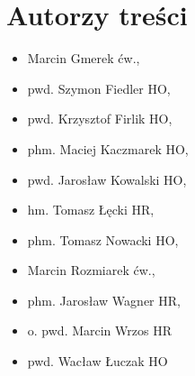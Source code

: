 \chapter{Autorzy treści}
\begin{itemize}
\item Marcin Gmerek ćw., 
\item pwd. Szymon Fiedler HO, 
\item pwd. Krzysztof Firlik HO, 
\item phm. Maciej Kaczmarek HO, 
\item pwd. Jarosław Kowalski HO, 
\item hm. Tomasz Łęcki HR, 
\item phm. Tomasz Nowacki HO, 
\item Marcin Rozmiarek ćw., 
\item phm. Jarosław Wagner HR, 
\item o. pwd. Marcin Wrzos HR 
\item pwd. Wacław Łuczak HO
\end{itemize}
